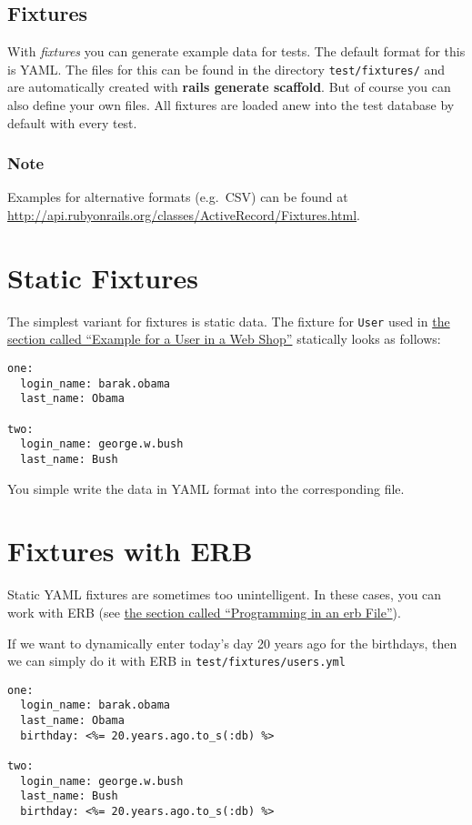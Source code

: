 \documentclass[a4paper]{book}
\newcounter{tab}[chapter]
\newcommand{\chap}[1]{\newpage\thispagestyle{empty}\chapter{#1}\label{chap:\thechapter}}
\begin{document}
\section{Fixtures}\label{fixtures}

With \emph{fixtures} you can generate example data for tests. The default format for this is YAML. The files for this can be found in the directory \texttt{test/fixtures/} and are automatically created with \textbf{rails generate scaffold}. But of course you can also define your own files. All fixtures are loaded anew into the test database by default with every test.

\subsection{Note}\label{note-42}

Examples for alternative formats (e.g.~CSV) can be found at \url{http://api.rubyonrails.org/classes/ActiveRecord/Fixtures.html}.

\chap{Static Fixtures}\label{static-fixtures}

The simplest variant for fixtures is static data. The fixture for \texttt{User} used in \hyperref[testingux5fbeispielux5fwebshop]{the section called “Example for a User in a Web Shop”} statically looks as follows:

\begin{shaded}\begin{verbatim}
one:
  login_name: barak.obama
  last_name: Obama

two:
  login_name: george.w.bush
  last_name: Bush
\end{verbatim}\end{shaded}

You simple write the data in YAML format into the corresponding file.

\chap{Fixtures with ERB}\label{fixtures-with-erb}

Static YAML fixtures are sometimes too unintelligent. In these cases, you can work with ERB (see \hyperref[erb-programmieren]{the section called “Programming in an erb File”}).

If we want to dynamically enter today's day 20 years ago for the birthdays, then we can simply do it with ERB in \texttt{test/fixtures/users.yml}

\begin{shaded}\begin{verbatim}
one:
  login_name: barak.obama
  last_name: Obama
  birthday: <%= 20.years.ago.to_s(:db) %>

two:
  login_name: george.w.bush
  last_name: Bush
  birthday: <%= 20.years.ago.to_s(:db) %>
\end{verbatim}\end{shaded}
\end{document}
